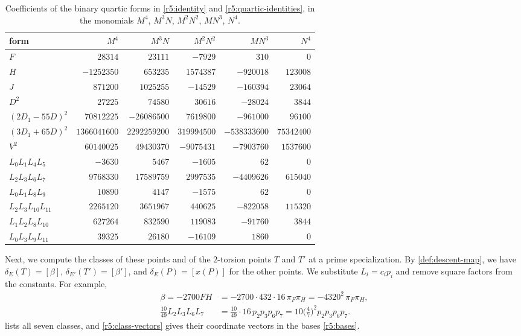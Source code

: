 \documentclass[12pt,oneside,openany]{book}
\theoremstyle{definition}
\theoremstyle{plain}
\numberwithin{equation}{chapter}
\theoremstyle{plain}
\theoremstyle{definition}
\theoremstyle{remark}
\newcommand{\sq}[1]{[#1]}
\begin{document}
\begin{table}[htbp]
\centering
\caption{Coefficients of the binary quartic forms in \eqref{r5:identity} and \eqref{r5:quartic-identities}, in the monomials $M^4$, $M^3N$, $M^2N^2$, $MN^3$, $N^4$.}\label{tab:r5-quartics}
\small
\begin{tabular}{lrrrrr}
\toprule
form & $M^4$ & $M^3N$ & $M^2N^2$ & $MN^3$ & $N^4$\\
\midrule
$F$ & $28314$ & $23111$ & $-7929$ & $310$ & $0$\\
$H$ & $-1252350$ & $653235$ & $1574387$ & $-920018$ & $123008$\\
$J$ & $871200$ & $1025255$ & $-14529$ & $-160394$ & $23064$\\
\midrule
$D^2$ & $27225$ & $74580$ & $30616$ & $-28024$ & $3844$\\
$(2D_1-55D)^2$ & $70812225$ & $-26086500$ & $7619800$ & $-961000$ & $96100$\\
$(3D_1+65D)^2$ & $1366041600$ & $2292259200$ & $319994500$ & $-538333600$ & $75342400$\\
$V^2$ & $60140025$ & $49430370$ & $-9075431$ & $-7903760$ & $1537600$\\
\midrule
$L_0L_1L_4L_5$ & $-3630$ & $5467$ & $-1605$ & $62$ & $0$\\
$L_2L_3L_6L_7$ & $9768330$ & $17589759$ & $2997535$ & $-4409626$ & $615040$\\
$L_0L_1L_8L_9$ & $10890$ & $4147$ & $-1575$ & $62$ & $0$\\
$L_2L_3L_{10}L_{11}$ & $2265120$ & $3651967$ & $440625$ & $-822058$ & $115320$\\
$L_1L_2L_8L_{10}$ & $627264$ & $832590$ & $119083$ & $-91760$ & $3844$\\
$L_0L_3L_9L_{11}$ & $39325$ & $26180$ & $-16109$ & $1860$ & $0$\\
\bottomrule
\end{tabular}
\end{table}

Next, we compute the classes of these points and of the $2$-torsion points $T$ and $T'$ at a prime specialization. By \cref{def:descent-map}, we have $\delta_E(T)=\sq{\beta}$, $\delta_{E'}(T')=\sq{\beta'}$, and $\delta_E(P)=\sq{x(P)}$ for the other points. We substitute $L_i=c_ip_i$ and remove square factors from the constants. For example,
\[
\begin{aligned}
\beta=-2700FH&=-2700\cdot432\cdot16\,\pi_F\pi_H=-4320^2\,\pi_F\pi_H,\\
\tfrac{10}{49}L_2L_3L_6L_7&=\tfrac{10}{49}\cdot16\,p_2p_3p_6p_7=10\big(\tfrac47\big)^2p_2p_3p_6p_7.
\end{aligned}
\]
 lists all seven classes, and \eqref{r5:class-vectors} gives their coordinate vectors in the bases \eqref{r5:bases}.
\end{document}
